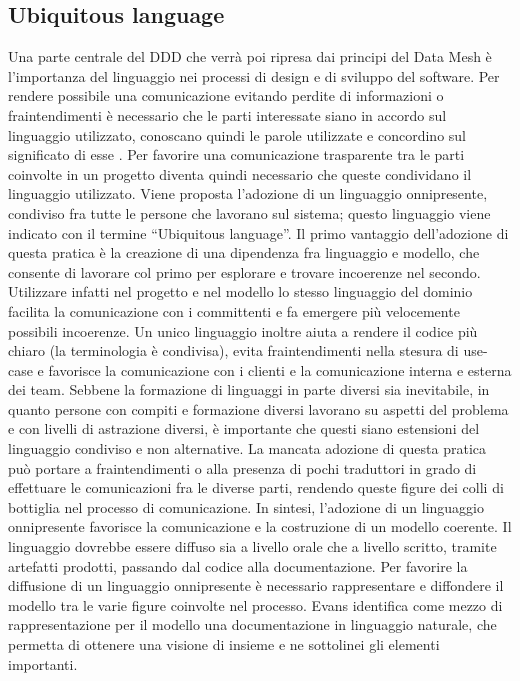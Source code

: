 \documentclass[a4paper,12pt]{report}
\begin{document}
\subsection{Ubiquitous language}
Una parte centrale del DDD che verrà poi ripresa dai principi del Data Mesh è l'importanza del linguaggio nei processi di design e di sviluppo del software.
Per rendere possibile una comunicazione evitando perdite di informazioni o fraintendimenti è necessario che le parti interessate siano in accordo sul linguaggio utilizzato, conoscano quindi le parole utilizzate e concordino sul significato di esse \cite{adler_how_2014}.
Per favorire una comunicazione trasparente tra le parti coinvolte in un progetto diventa quindi necessario che queste condividano il linguaggio utilizzato.
Viene proposta l'adozione di un linguaggio onnipresente, condiviso fra tutte le persone che lavorano sul sistema; questo linguaggio viene indicato con il termine ``Ubiquitous language''.
Il primo vantaggio dell'adozione di questa pratica è la creazione di una dipendenza fra linguaggio e modello, che consente di lavorare col primo per esplorare e trovare incoerenze nel secondo.
Utilizzare infatti nel progetto e nel modello lo stesso linguaggio del dominio facilita la comunicazione con i committenti e fa emergere più velocemente possibili incoerenze.
Un unico linguaggio inoltre aiuta a rendere il codice più chiaro (la terminologia è condivisa), evita fraintendimenti nella stesura di use-case e favorisce la comunicazione con i clienti e la comunicazione interna e esterna dei team.
Sebbene la formazione di linguaggi in parte diversi sia inevitabile, in quanto persone con compiti e formazione diversi lavorano su aspetti del problema e con livelli di astrazione diversi, è importante che questi siano estensioni del linguaggio condiviso e non alternative.
La mancata adozione di questa pratica può portare a fraintendimenti o alla presenza di pochi traduttori in grado di effettuare le comunicazioni fra le diverse parti, rendendo queste figure dei colli di bottiglia nel processo di comunicazione. 
In sintesi, l'adozione di un linguaggio onnipresente favorisce la comunicazione e la costruzione di un modello coerente.
Il linguaggio dovrebbe essere diffuso sia a livello orale che a livello scritto, tramite artefatti prodotti, passando dal codice alla documentazione.
Per favorire la diffusione di un linguaggio onnipresente è necessario rappresentare e diffondere il modello tra le varie figure coinvolte nel processo.
Evans identifica come mezzo di rappresentazione per il modello una documentazione in linguaggio naturale, che permetta di ottenere una visione di insieme e ne sottolinei gli elementi importanti.
\end{document}
